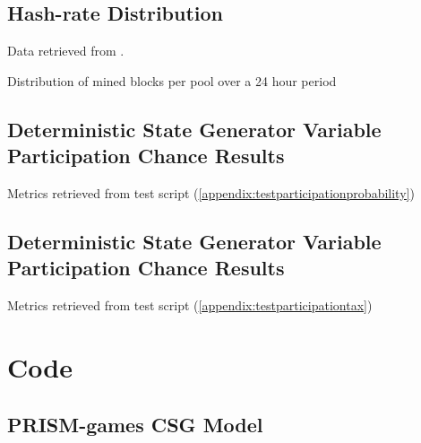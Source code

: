 \section{Hash-rate Distribution} \label{appendix:hashrate-distribution}

Data retrieved from \cite{bitcoinhashrate2020}.
\begin{table}[H]
    \centering
    \caption{Distribution of mined blocks per pool over a 24 hour period}
    \label{table:hashrate-distribution}
\end{table}

\section{Deterministic State Generator Variable Participation Chance Results} \label{appendix:state-results}

\begin{table}[H]
    \centering
    \caption{Metrics retrieved from test script (\cref{appendix:testparticipationprobability})}
    \label{table:testparticipationprobability}
\end{table}


\section{Deterministic State Generator Variable Participation Chance Results} \label{appendix:state-results-tax}

\begin{table}[H]
    \centering
    \caption{Metrics retrieved from test script (\cref{appendix:testparticipationtax})}
    \label{table:testparticipationprobability}
\end{table}

\chapter{Code}

\section{PRISM-games CSG Model}
\label{appendix:prism-model}

